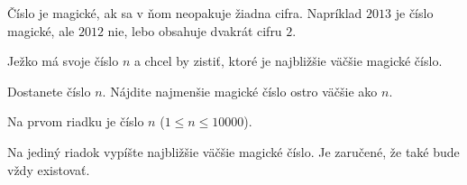 




Číslo je magické, ak sa v ňom neopakuje žiadna cifra. Napríklad $2013$ je číslo magické, ale $2012$
nie, lebo obsahuje dvakrát cifru $2$.

Ježko má svoje číslo $n$ a chcel by zistiť, ktoré je najbližšie väčšie magické číslo.


Dostanete číslo $n$. Nájdite najmenšie magické číslo ostro väčšie ako $n$.


Na prvom riadku je číslo $n$ ($1\leq n \leq 10000$).


Na jediný riadok vypíšte najbližšie väčšie magické číslo. Je zaručené, že také bude vždy existovať.


\koniec

\koniec


